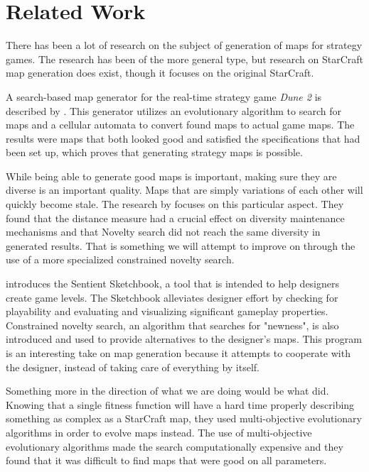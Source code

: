 \chapter{Related Work}
\label{relatedwork}

There has been a lot of research on the subject of generation of maps for strategy games. The research has been of the more general type, but research on StarCraft map generation does exist, though it focuses on the original StarCraft.

A search-based map generator for the real-time strategy game \textit{Dune 2} is described by \citeauthor{Mahlmann2012Spicing}\cite{Mahlmann2012Spicing}. This generator utilizes an evolutionary algorithm to search for maps and a cellular automata to convert found maps to actual game maps. The results were maps that both looked good and satisfied the specifications that had been set up, which proves that generating strategy maps is possible.

While being able to generate good maps is important, making sure they are diverse is an important quality. Maps that are simply variations of each other will quickly become stale. The research by \citeauthor{Preuss2014Searching}\cite{Preuss2014Searching} focuses on this particular aspect. They found that the distance measure had a crucial effect on diversity maintenance mechanisms and that Novelty search did not reach the same diversity in generated results. That is something we will attempt to improve on through the use of a more specialized constrained novelty search.

\citeauthor{Liapis2013sentient}\cite{Liapis2013sentient} introduces the Sentient Sketchbook, a tool that is intended to help designers create game levels. The Sketchbook alleviates designer effort by checking for playability and evaluating and visualizing significant gameplay properties. Constrained novelty search, an algorithm that searches for "newness",  is also introduced and used to provide alternatives to the designer's maps. This program is an interesting take on map generation because it attempts to cooperate with the designer, instead of taking care of everything by itself.

Something more in the direction of what we are doing would be what \citeauthor{Togelius2010Multiobjective}\cite{Togelius2010Multiobjective} did. Knowing that a single fitness function will have a hard time properly describing something as complex as a StarCraft map, they used multi-objective evolutionary algorithms in order to evolve maps instead. The use of multi-objective evolutionary algorithms made the search computationally expensive and they found that it was difficult to find maps that were good on all parameters.

